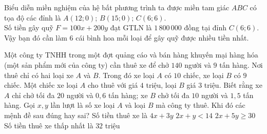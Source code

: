 \begin{bt}
{\begin{center}
		\end{center}
		Biểu diễn miền nghiệm của hệ bất phương trình ta được miền tam giác $ABC$ có tọa độ các đỉnh là $A(12;0)$; $B(15;0)$; $C(6;6)$.\\
		Số tiền gây quỹ $F=100x+200y$ đạt GTLN là $1\,800\,000$ đồng tại đỉnh $C(6;6)$.\\
		Vậy bạn đó cần làm $6$ cái bình hoa mỗi loại để gây quỹ được nhiều tiền nhất.
	}
\end{bt}

\begin{ex}%
	Một công ty TNHH trong một đợt quảng cáo và bán hàng khuyến mại hàng hóa (một sản phẩm mới của công ty) cần thuê xe để chở $140$ người và $9$ tấn hàng. Nơi thuê chỉ có hai loại xe $A$ và $B$. Trong đó xe loại $A$ có $10$ chiếc, xe loại $B$ có $9$ chiếc. Một chiếc xe loại $A$ cho thuê với giá $4$ triệu, loại $B$ giá $3$ triệu. Biết rằng xe $A$ chỉ chở tối đa $20$ người và $0{,}6$ tấn hàng; xe $B$ chở tối đa $10$ người và $1{,}5$ tấn hàng. Gọi $x,y$ lần lượt là số xe loại $A$ và loại $B$ mà công ty thuê. Khi đó các mệnh đề sau đúng hay sai?
	\choiceTF
	{\True Số tiền thuê xe là $4x+3y$}
	{$2x+y < 14$}
	{\True $2x+5y\ge 30$}
	{\True Số tiền thuê xe thấp nhất là $32$ triệu}
\end{ex}
